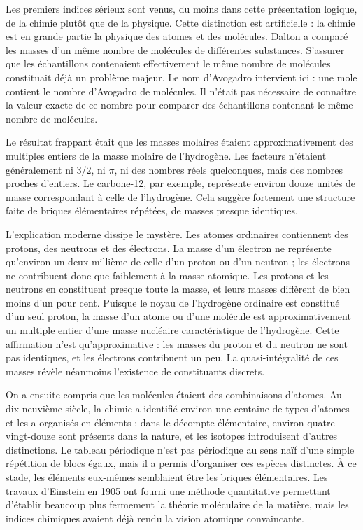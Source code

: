 Les premiers indices sérieux sont venus, du moins dans cette présentation logique, de la chimie plutôt que de la physique. Cette distinction est artificielle : la chimie est en grande partie la physique des atomes et des molécules. Dalton a comparé les masses d’un même nombre de molécules de différentes substances. S’assurer que les échantillons contenaient effectivement le même nombre de molécules constituait déjà un problème majeur. Le nom d’Avogadro intervient ici : une mole contient le nombre d’Avogadro de molécules. Il n’était pas nécessaire de connaître la valeur exacte de ce nombre pour comparer des échantillons contenant le même nombre de molécules.

Le résultat frappant était que les masses molaires étaient approximativement des multiples entiers de la masse molaire de l’hydrogène. Les facteurs n’étaient généralement ni \(3/2\), ni \(\pi\), ni des nombres réels quelconques, mais des nombres proches d’entiers. Le carbone-12, par exemple, représente environ douze unités de masse correspondant à celle de l’hydrogène. Cela suggère fortement une structure faite de briques élémentaires répétées, de masses presque identiques.

L’explication moderne dissipe le mystère. Les atomes ordinaires contiennent des protons, des neutrons et des électrons. La masse d’un électron ne représente qu’environ un deux-millième de celle d’un proton ou d’un neutron ; les électrons ne contribuent donc que faiblement à la masse atomique. Les protons et les neutrons en constituent presque toute la masse, et leurs masses diffèrent de bien moins d’un pour cent. Puisque le noyau de l’hydrogène ordinaire est constitué d’un seul proton, la masse d’un atome ou d’une molécule est approximativement un multiple entier d’une masse nucléaire caractéristique de l’hydrogène. Cette affirmation n’est qu’approximative : les masses du proton et du neutron ne sont pas identiques, et les électrons contribuent un peu. La quasi-intégralité de ces masses révèle néanmoins l’existence de constituants discrets.

On a ensuite compris que les molécules étaient des combinaisons d’atomes. Au dix-neuvième siècle, la chimie a identifié environ une centaine de types d’atomes et les a organisés en éléments ; dans le décompte élémentaire, environ quatre-vingt-douze sont présents dans la nature, et les isotopes introduisent d’autres distinctions. Le tableau périodique n’est pas périodique au sens naïf d’une simple répétition de blocs égaux, mais il a permis d’organiser ces espèces distinctes. À ce stade, les éléments eux-mêmes semblaient être les briques élémentaires. Les travaux d’Einstein en 1905 ont fourni une méthode quantitative permettant d’établir beaucoup plus fermement la théorie moléculaire de la matière, mais les indices chimiques avaient déjà rendu la vision atomique convaincante.

